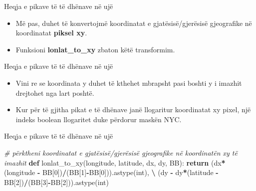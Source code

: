 \documentclass[
  ignorenonframetext,
]{beamer}
\newenvironment{Shaded}{\begin{snugshade}}{\end{snugshade}}
\newcommand{\CommentTok}[1]{\textcolor[rgb]{0.56,0.35,0.01}{\textit{#1}}}
\newcommand{\ControlFlowTok}[1]{\textcolor[rgb]{0.13,0.29,0.53}{\textbf{#1}}}
\newcommand{\DecValTok}[1]{\textcolor[rgb]{0.00,0.00,0.81}{#1}}
\newcommand{\KeywordTok}[1]{\textcolor[rgb]{0.13,0.29,0.53}{\textbf{#1}}}
\newcommand{\NormalTok}[1]{#1}
\newcommand{\OperatorTok}[1]{\textcolor[rgb]{0.81,0.36,0.00}{\textbf{#1}}}
\newcommand{\StringTok}[1]{\textcolor[rgb]{0.31,0.60,0.02}{#1}}
\begin{document}
\begin{frame}{Heqja e pikave të të dhënave në ujë}
\protect\hypertarget{heqja-e-pikave-tuxeb-tuxeb-dhuxebnave-nuxeb-ujuxeb-2}{}
\begin{itemize}
\item
  Më pas, duhet të konvertojmë koordinatat e gjatësisë/gjerësisë
  gjeografike në koordinatat \textbf{piksel xy}.
\item
  Funksioni \textbf{lonlat\_to\_xy} zbaton këtë transformim.
\end{itemize}
\end{frame}

\begin{frame}{Heqja e pikave të të dhënave në ujë}
\protect\hypertarget{heqja-e-pikave-tuxeb-tuxeb-dhuxebnave-nuxeb-ujuxeb-3}{}
\begin{itemize}
\item
  Vini re se koordinata y duhet të kthehet mbrapsht pasi boshti y i
  imazhit drejtohet nga lart poshtë.
\item
  Kur për të gjitha pikat e të dhënave janë llogaritur koordinatat xy
  pixel, një indeks boolean llogaritet duke përdorur maskën NYC.
\end{itemize}
\end{frame}

\begin{frame}[fragile]{Heqja e pikave të të dhënave në ujë}
\protect\hypertarget{heqja-e-pikave-tuxeb-tuxeb-dhuxebnave-nuxeb-ujuxeb-4}{}

\begin{Shaded}
\begin{Highlighting}[]
\CommentTok{\# përktheni koordinatat e gjatësisë/gjerësisë gjeografike në koordinatën xy të imazhit}
\KeywordTok{def}\NormalTok{ lonlat\_to\_xy(longitude, latitude, dx, dy, BB):}
    \ControlFlowTok{return}\NormalTok{ (dx}\OperatorTok{*}\NormalTok{(longitude }\OperatorTok{{-}}\NormalTok{ BB[}\DecValTok{0}\NormalTok{])}\OperatorTok{/}\NormalTok{(BB[}\DecValTok{1}\NormalTok{]}\OperatorTok{{-}}\NormalTok{BB[}\DecValTok{0}\NormalTok{])).astype(}\StringTok{\textquotesingle{}int\textquotesingle{}}\NormalTok{), }\OperatorTok{\textbackslash{}}
\NormalTok{           (dy }\OperatorTok{{-}}\NormalTok{ dy}\OperatorTok{*}\NormalTok{(latitude }\OperatorTok{{-}}\NormalTok{ BB[}\DecValTok{2}\NormalTok{])}\OperatorTok{/}\NormalTok{(BB[}\DecValTok{3}\NormalTok{]}\OperatorTok{{-}}\NormalTok{BB[}\DecValTok{2}\NormalTok{])).astype(}\StringTok{\textquotesingle{}int\textquotesingle{}}\NormalTok{)}
\end{Highlighting}
\end{Shaded}
\end{frame}
\end{document}
